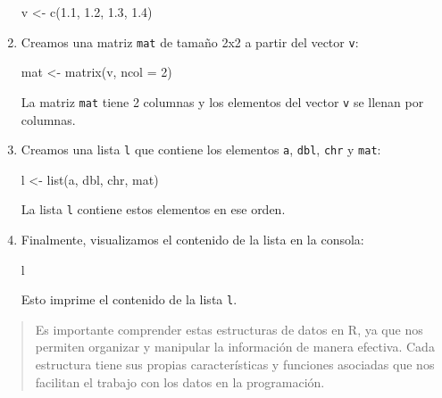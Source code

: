 \documentclass[
  letterpaper,
  DIV=11,
  numbers=noendperiod]{scrartcl}
\newenvironment{Shaded}{}{}
\newcommand{\AttributeTok}[1]{\textcolor[rgb]{0.84,0.23,0.29}{#1}}
\newcommand{\DecValTok}[1]{\textcolor[rgb]{0.00,0.36,0.77}{#1}}
\newcommand{\FloatTok}[1]{\textcolor[rgb]{0.00,0.36,0.77}{#1}}
\newcommand{\FunctionTok}[1]{\textcolor[rgb]{0.44,0.26,0.76}{#1}}
\newcommand{\NormalTok}[1]{\textcolor[rgb]{0.14,0.16,0.18}{#1}}
\newcommand{\OtherTok}[1]{\textcolor[rgb]{0.44,0.26,0.76}{#1}}
\begin{document}
\begin{enumerate}
\begin{Shaded}
\begin{Highlighting}[]
\NormalTok{v }\OtherTok{\textless{}{-}} \FunctionTok{c}\NormalTok{(}\FloatTok{1.1}\NormalTok{, }\FloatTok{1.2}\NormalTok{, }\FloatTok{1.3}\NormalTok{, }\FloatTok{1.4}\NormalTok{)}
\end{Highlighting}
\end{Shaded}
\item
  Creamos una matriz \texttt{mat} de tamaño 2x2 a partir del vector
  \texttt{v}:

\begin{Shaded}
\begin{Highlighting}[]
\NormalTok{mat }\OtherTok{\textless{}{-}} \FunctionTok{matrix}\NormalTok{(v, }\AttributeTok{ncol =} \DecValTok{2}\NormalTok{)}
\end{Highlighting}
\end{Shaded}

  La matriz \texttt{mat} tiene 2 columnas y los elementos del vector
  \texttt{v} se llenan por columnas.
\item
  Creamos una lista \texttt{l} que contiene los elementos \texttt{a},
  \texttt{dbl}, \texttt{chr} y \texttt{mat}:

\begin{Shaded}
\begin{Highlighting}[]
\NormalTok{l }\OtherTok{\textless{}{-}} \FunctionTok{list}\NormalTok{(a, dbl, chr, mat)}
\end{Highlighting}
\end{Shaded}

  La lista \texttt{l} contiene estos elementos en ese orden.
\item
  Finalmente, visualizamos el contenido de la lista en la consola:

\begin{Shaded}
\begin{Highlighting}[]
\NormalTok{l}
\end{Highlighting}
\end{Shaded}

  Esto imprime el contenido de la lista \texttt{l}.
\end{enumerate}

\begin{quote}
Es importante comprender estas estructuras de datos en R, ya que nos
permiten organizar y manipular la información de manera efectiva. Cada
estructura tiene sus propias características y funciones asociadas que
nos facilitan el trabajo con los datos en la programación.
\end{quote}


\printbibliography
\end{document}
